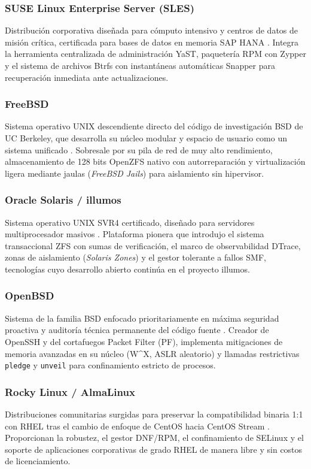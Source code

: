 \documentclass[12pt]{article}
\begin{document}
\subsubsection{SUSE Linux Enterprise Server (SLES)}
Distribución corporativa diseñada para cómputo intensivo y centros de datos de misión crítica, certificada para bases de datos en memoria SAP HANA \parencite{suseSles}. Integra la herramienta centralizada de administración YaST, paquetería RPM con Zypper y el sistema de archivos Btrfs con instantáneas automáticas Snapper para recuperación inmediata ante actualizaciones.

\subsubsection{FreeBSD}
Sistema operativo UNIX descendiente directo del código de investigación BSD de UC Berkeley, que desarrolla su núcleo modular y espacio de usuario como un sistema unificado \parencite{freebsdRelnotes}. Sobresale por su pila de red de muy alto rendimiento, almacenamiento de 128 bits OpenZFS nativo con autorreparación y virtualización ligera mediante jaulas (\textit{FreeBSD Jails}) para aislamiento sin hipervisor.

\subsubsection{Oracle Solaris / illumos}
Sistema operativo UNIX SVR4 certificado, diseñado para servidores multiprocesador masivos \parencite{oracleSolaris}. Plataforma pionera que introdujo el sistema transaccional ZFS con sumas de verificación, el marco de observabilidad DTrace, zonas de aislamiento (\textit{Solaris Zones}) y el gestor tolerante a fallos SMF, tecnologías cuyo desarrollo abierto continúa en el proyecto illumos.

\subsubsection{OpenBSD}
Sistema de la familia BSD enfocado prioritariamente en máxima seguridad proactiva y auditoría técnica permanente del código fuente \parencite{openbsdProject}. Creador de OpenSSH y del cortafuegos Packet Filter (PF), implementa mitigaciones de memoria avanzadas en su núcleo (W\^{}X, ASLR aleatorio) y llamadas restrictivas \texttt{pledge} y \texttt{unveil} para confinamiento estricto de procesos.

\subsubsection{Rocky Linux / AlmaLinux}
Distribuciones comunitarias surgidas para preservar la compatibilidad binaria 1:1 con RHEL tras el cambio de enfoque de CentOS hacia CentOS Stream \parencite{rockyLinux}. Proporcionan la robustez, el gestor DNF/RPM, el confinamiento de SELinux y el soporte de aplicaciones corporativas de grado RHEL de manera libre y sin costos de licenciamiento.
\end{document}
